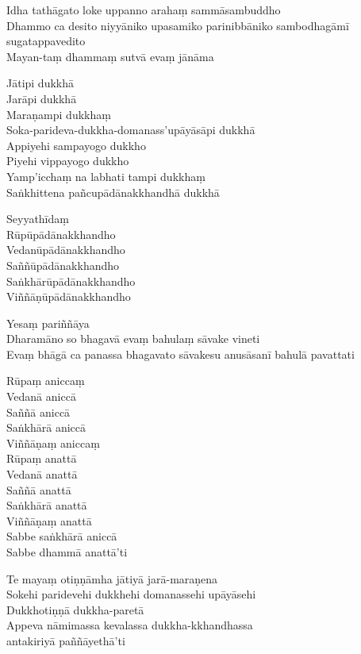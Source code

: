 Idha tathāgato loke uppanno arahaṃ sammāsambuddho\\
Dhammo ca desito niyyāniko upasamiko parinibbāniko sambodhagāmī sugatappavedito\\
Mayan-taṃ dhammaṃ sutvā evaṃ jānāma

\clearpage

Jātipi dukkhā\\
Jarāpi dukkhā\\
Maraṇampi dukkhaṃ\\
Soka-parideva-dukkha-domanass'upāyāsāpi dukkhā\\
Appiyehi sampayogo dukkho\\
Piyehi vippayogo dukkho\\
Yamp'icchaṃ na labhati tampi dukkhaṃ\\
Saṅkhittena pañcupādānakkhandhā dukkhā

Seyyathīdaṃ\\
Rūpūpādānakkhandho\\
Vedanūpādānakkhandho\\
Saññūpādānakkhandho\\
Saṅkhārūpādānakkhandho\\
Viññāṇūpādānakkhandho

Yesaṃ pariññāya\\
Dharamāno so bhagavā evaṃ bahulaṃ sāvake vineti\\
Evaṃ bhāgā ca panassa bhagavato sāvakesu anusāsanī bahulā pavattati

Rūpaṃ aniccaṃ\\
Vedanā aniccā\\
Saññā aniccā\\
Saṅkhārā aniccā\\
Viññāṇaṃ aniccaṃ\\
Rūpaṃ anattā\\
Vedanā anattā\\
Saññā anattā\\
Saṅkhārā anattā\\
Viññāṇaṃ anattā\\
Sabbe saṅkhārā aniccā\\
Sabbe dhammā anattā'ti

Te mayaṃ otiṇṇāmha jātiyā jarā-maraṇena\\
Sokehi paridevehi dukkhehi domanassehi upāyāsehi\\
Dukkhotiṇṇā dukkha-paretā\\
Appeva nāmimassa kevalassa dukkha-kkhandhassa\\
antakiriyā paññāyethā'ti

